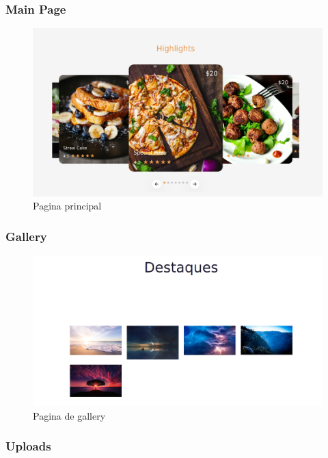 \documentclass{report}
\begin{document}
\subsubsection{Main Page}

\begin{figure}[H]
    \centering
    \includegraphics[scale=0.2]{../images/main}
    \caption{Pagina principal}
    \label{fig:Main}
\end{figure}

\subsubsection{Gallery}

\begin{figure}[H]
    \centering
    \includegraphics[scale=0.2]{../images/gallery}
    \caption{Pagina de gallery}
    \label{fig:galley }
\end{figure}

\subsubsection{Uploads}
\end{document}
